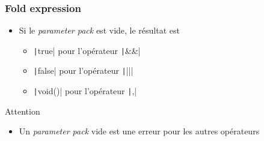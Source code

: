 \documentclass[C++.tex]{subfiles}
\begin{document}
\begin{frame}[fragile]
	\frametitle{Fold expression}
	\begin{itemize}
		\item Si le \textit{parameter pack} est vide, le résultat est
		\begin{itemize}
			\item \texttt|true| pour l'opérateur \texttt|&&|
			\item \texttt|false| pour l'opérateur \texttt||||
			\item \texttt|void()| pour l'opérateur \texttt|,|
		\end{itemize}
	\end{itemize}

	\begin{alertblock}{Attention}
		\begin{itemize}
			\item Un \textit{parameter pack} vide est une erreur pour les autres opérateurs
		\end{itemize}
	\end{alertblock}

\end{frame}
\end{document}
